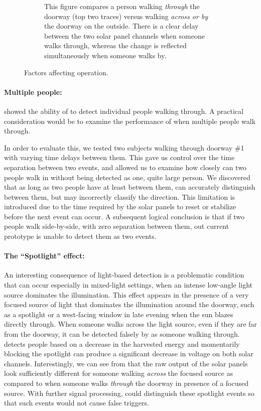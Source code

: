 \begin{figure}[t]
\begin{subfigure}[t]{0.35\textwidth}
        \caption{ This figure compares a person walking \textit{through} the doorway (top two traces) versus walking \textit{across or by} the doorway on the outside. There is a clear delay between the two solar panel channels when someone walks through, whereas the change is reflected simultaneously when someone walks by.}
        \label{fig:across}
    \end{subfigure}
    \caption{Factors affecting \sysname operation. \label{fig:confounds}}
\end{figure}


\paragraph{Multiple people:}
 showed the ability of \sysname to detect individual people walking through.
A practical consideration would be to examine the performance of \sysname when multiple people walk through.

In order to evaluate this, we tested two subjects walking through doorway \#1 with varying time delays between them.
This gave us control over the time separation between two events, and allowed us to examine how closely can two people walk in without being detected as one, quite large person.
We discovered that as long as two people have at least \minSeparation between them, \sysname can accurately distinguish between them, but may incorrectly classify the direction.
This limitation is introduced due to the time required by the solar panels to reset or stabilize before the next event can occur.
A subsequent logical conclusion is that if two people walk side-by-side, \ie with zero separation between them, out current prototype is unable to detect them as two events.

\paragraph{The ``Spotlight'' effect:}
An interesting consequence of light-based detection is a problematic condition that can occur especially in mixed-light settings, when an intense low-angle light source dominates the illumination.
This effect appears in the presence of a very focused source of light that dominates the illumination around the doorway, such as a spotlight or a west-facing window in late evening when the sun blazes directly through.
When someone walks across the light source, even if they are far from the doorway, it can be detected falsely by \sysname as someone walking through.
\sysname detects people based on a decrease in the harvested energy and momentarily blocking the spotlight can produce a significant decrease in voltage on both solar channels.
Interestingly, we can see from  that the raw output of the solar panels look sufficiently different for someone walking \textit{across} the focused source as compared to when someone walks \textit{through} the doorway in presence of a focused source.
With further signal processing, \sysname could distinguish these spotlight events so that such events would not cause false triggers.


